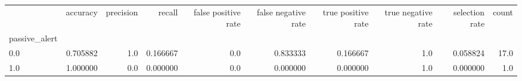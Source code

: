 \begin{tabular}{lrrrrrrrrr}
\toprule
{} &  accuracy &  precision &    recall &  false positive rate &  false negative rate &  true positive rate &  true negative rate &  selection rate &  count \\
passive\_alert &           &            &           &                      &                      &                     &                     &                 &        \\
\midrule
0.0           &  0.705882 &        1.0 &  0.166667 &                  0.0 &             0.833333 &            0.166667 &                 1.0 &        0.058824 &   17.0 \\
1.0           &  1.000000 &        0.0 &  0.000000 &                  0.0 &             0.000000 &            0.000000 &                 1.0 &        0.000000 &    1.0 \\
\bottomrule
\end{tabular}
